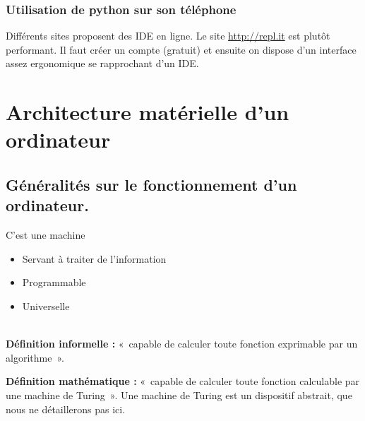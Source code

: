 \subsubsection{Utilisation de python sur son téléphone}

Différents sites proposent des IDE en ligne. Le site \url{http://repl.it} est plutôt performant. Il faut créer un compte (gratuit) et ensuite on dispose d'un interface assez ergonomique se rapprochant d'un IDE.




\section{Architecture matérielle d'un ordinateur}
\subsection{Généralités sur le fonctionnement d'un ordinateur.}\label{sec.ordi}

\begin{defi}
C'est une machine
\begin{itemize}
\item Servant à traiter de l'information
\item Programmable
\item Universelle
\end{itemize}
\end{defi}

\begin{defi}[Universelle] ~\\
\textbf{Définition informelle :} «~capable de calculer toute fonction exprimable par un
algorithme~».

\noindent \textbf{Définition mathématique :} «~capable de calculer toute fonction calculable par
  une machine de Turing~». Une machine de Turing est un dispositif abstrait, que nous ne détaillerons pas ici. 
\end{defi}

